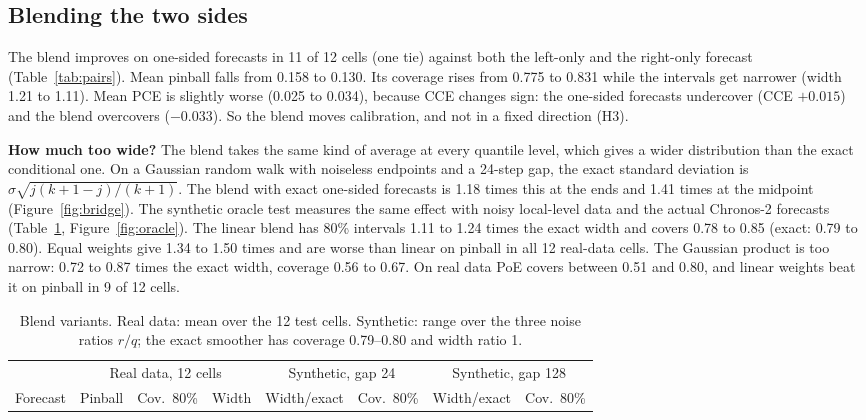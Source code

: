 \documentclass[10pt,twocolumn]{article}
\newcommand{\Chr}{Chronos-2}
\begin{document}
\subsection{Blending the two sides}\label{sec:blend}
The blend improves on one-sided forecasts in 11 of 12 cells (one tie) against both the left-only and the right-only forecast (Table~\ref{tab:pairs}). Mean pinball falls from 0.158 to 0.130. Its coverage rises from 0.775 to 0.831 while the intervals get narrower (width 1.21 to 1.11). Mean PCE is slightly worse (0.025 to 0.034), because CCE changes sign: the one-sided forecasts undercover (CCE $+0.015$) and the blend overcovers ($-0.033$). So the blend moves calibration, and not in a fixed direction (H3).

\textbf{How much too wide?} The blend takes the same kind of average at every quantile level, which gives a wider distribution than the exact conditional one. On a Gaussian random walk with noiseless endpoints and a 24-step gap, the exact standard deviation is $\sigma\sqrt{j(k+1-j)/(k+1)}$. The blend with exact one-sided forecasts is 1.18 times this at the ends and 1.41 times at the midpoint (Figure~\ref{fig:bridge}). The synthetic oracle test measures the same effect with noisy local-level data and the actual \Chr{} forecasts (Table~\ref{tab:variants}, Figure~\ref{fig:oracle}). The linear blend has 80\% intervals 1.11 to 1.24 times the exact width and covers 0.78 to 0.85 (exact: 0.79 to 0.80). Equal weights give 1.34 to 1.50 times and are worse than linear on pinball in all 12 real-data cells. The Gaussian product is too narrow: 0.72 to 0.87 times the exact width, coverage 0.56 to 0.67. On real data PoE covers between 0.51 and 0.80, and linear weights beat it on pinball in 9 of 12 cells.

\begin{table}[t]
\centering\small
\setlength{\tabcolsep}{5pt}
\begin{tabular}{@{}l ccc cc cc@{}}
\toprule
 & \multicolumn{3}{c}{Real data, 12 cells} & \multicolumn{2}{c}{Synthetic, gap 24} & \multicolumn{2}{c}{Synthetic, gap 128}\\
\cmidrule(lr){2-4}\cmidrule(lr){5-6}\cmidrule(l){7-8}
Forecast & Pinball & Cov.\ 80\% & Width & Width/exact & Cov.\ 80\% & Width/exact & Cov.\ 80\%\\
\midrule

\end{tabular}
\caption{Blend variants. Real data: mean over the 12 test cells. Synthetic: range over the three noise ratios $r/q$; the exact smoother has coverage 0.79--0.80 and width ratio 1.}
\label{tab:variants}
\end{table}
\end{document}
